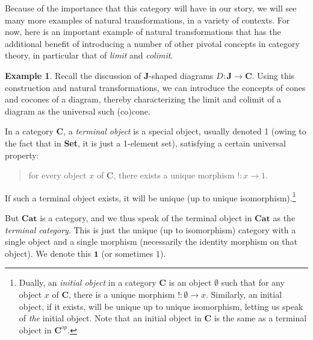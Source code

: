 \documentclass[11pt]{book}
\theoremstyle{definition}
\newtheorem{example}{Example}[section]
\theoremstyle{definition}
\theoremstyle{definition}
\theoremstyle{theorem}
\theoremstyle{definition}
\begin{document}
Because of the importance that this category will have in our story, we will see many more examples of natural transformations, in a variety of contexts. For now, here is an important example of natural transformations that has the additional benefit of introducing a number of other pivotal concepts in category theory, in particular that of \textit{limit} and \textit{colimit}.    
\begin{example}
	Recall the discussion of \textbf{J}-shaped diagrams $D: \textbf{J} \rightarrow \textbf{C}$. Using this construction and natural transformations, we can introduce the concepts of cones and cocones of a diagram, thereby characterizing the limit and colimit of a diagram as the universal such (co)cone. \par 
	In a category \textbf{C}, a \textit{terminal object} is a special object, usually denoted 1 (owing to the fact that in \textbf{Set}, it is just a 1-element set), satisfying a certain universal property: 
	\begin{quote}
		for every object $x$ of $\textbf{C}$, there exists a unique morphism $!: x \rightarrow 1$. 
	\end{quote} 
If such a terminal object exists, it will be unique (up to unique isomorphism).\footnote{Dually, an \textit{initial object} in a category $\textbf{C}$ is an object $\emptyset$ such that for any object $x$ of $\textbf{C}$, there is a unique morphism $!: \emptyset \rightarrow x$. Similarly, an initial object, if it exists, will be unique up to unique isomorphism, letting us speak of \textit{the} initial object. Note that an initial object in $\textbf{C}$ is the same as a terminal object in $\textbf{C}^{op}$.} \par 
But $\textbf{Cat}$ is a category, and we thus speak of the terminal object in $\textbf{Cat}$ as the \textit{terminal category}.  This is just the unique (up to isomorphism) category with a single object and a single morphism (necessarily the identity morphism on that object). We denote this $\textbf{1}$ (or sometimes $\underline{1}$). \par   

\end{example}
\end{document}
